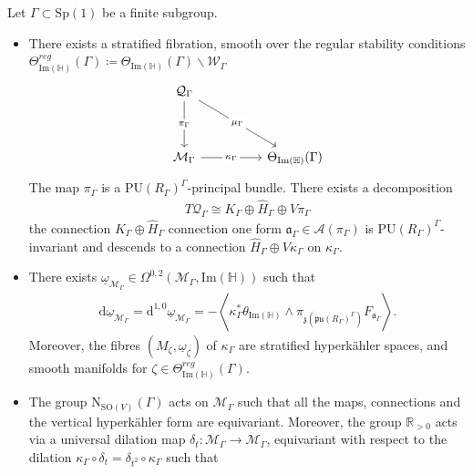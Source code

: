 \documentclass[psamsfonts]{amsart}
\theoremstyle{plain}
\theoremstyle{definition}{
\newtheorem{defi}{Definition}[section]
\newtheorem{ass}{Assumption}
\newtheorem*{nota}{Notation}}
\theoremstyle{remark}{
\newtheorem{rem}{Remark}
\newtheorem{ex}{Example}}
\theoremstyle{plain}{
\newtheorem{thm}{Theorem}[section]
\newtheorem{lem}{Lemma}[section]
\newtheorem{cor}{Corollary}[section]
\newtheorem{prop}{Proposition}[section]
\newtheorem{con}{Conjecture}[section]}
\newcommand{\m}[1]{{\mathrm{#1}}}
\begin{document}
\begin{prop}
\label{universalMcKaymoduli}
Let $\Gamma\subset\m{Sp}(1)$ be a finite subgroup. 
\begin{itemize}
    \item There exists a stratified fibration, smooth over the regular stability conditions $\Theta^{reg}_{\m{Im}(\mathbb{H})}(\Gamma)\coloneqq \Theta_{\m{Im}(\mathbb{H})}(\Gamma)\backslash\mathcal{W}_\Gamma$
\begin{equation*}
\begin{tikzcd}
	{\mathcal{Q}_\Gamma} && \\
	\\
	{\mathcal{M}_\Gamma} && {\Theta_{\mathrm{Im}(\mathbb{H})}(\Gamma)}
	\arrow["\pi_\Gamma"{description}, from=1-1, to=3-1]
	\arrow["\mu_\Gamma"{description}, from=1-1, to=3-3]
	\arrow["\kappa_\Gamma"{description}, from=3-1, to=3-3]
\end{tikzcd}
\end{equation*}
The map $\pi_\Gamma$ is a $\m{PU}(R_\Gamma)^{\Gamma}$-principal bundle. There exists a decomposition 
\begin{align*}
    T\mathcal{Q}_\Gamma\cong K_\Gamma\oplus \hat{H}_\Gamma\oplus V\pi_\Gamma
\end{align*}
the connection $K_\Gamma\oplus \hat{H}_\Gamma$ connection one form $\mathfrak{a}_\Gamma\in \mathcal{A}(\pi_\Gamma)$ is $\m{PU}(R_\Gamma)^{\Gamma}$-invariant and descends to a connection $\hat{H}_\Gamma\oplus V\kappa_\Gamma$ on $\kappa_\Gamma$.
\item There exists $\underline{\omega}_{\mathcal{M}_\Gamma}\in \Omega^{0,2}(\mathcal{M}_\Gamma,\m{Im}(\mathbb{H}))$ such that 
\begin{align*}
    \m{d}\underline{\omega}_{\mathcal{M}_\Gamma}=\m{d}^{1,0}\underline{\omega}_{\mathcal{M}_\Gamma}=-\left<\kappa_\Gamma^*\theta_{\m{Im}(\mathbb{H})}\wedge \pi_{\mathfrak{z}(\mathfrak{pu}(R_\Gamma)^\Gamma)}F_{\mathfrak{a}_\Gamma}\right>.
\end{align*}
Moreover, the fibres $(M_\zeta,\underline{\omega}_\zeta)$ of $\kappa_\Gamma$ are stratified hyperkähler spaces, and smooth manifolds for $\zeta\in \Theta^{reg}_{\m{Im}(\mathbb{H})}(\Gamma)$. 
\item The group $\m{N}_{\m{SO}(V)}(\Gamma)$ acts on $\mathcal{M}_\Gamma$ such that all the maps, connections and the vertical hyperkähler form are equivariant. Moreover, the group $\mathbb{R}_{>0}$ acts via a universal dilation map $\delta_t\colon \mathcal{M}_\Gamma\rightarrow \mathcal{M}_\Gamma$, equivariant with respect to the dilation $\kappa_\Gamma\circ \delta_t=\delta_{t^2}\circ \kappa_\Gamma$ such that 

\end{itemize}
\end{prop}
\end{document}
